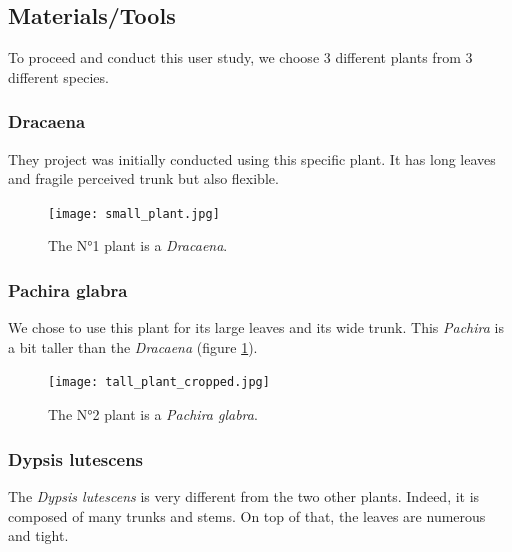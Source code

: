 \subsection{Materials/Tools}

To proceed and conduct this user study, we choose 3 different plants from 3 different species.

\newpage

\subsubsection{Dracaena}
They project was initially conducted using this specific plant. It has long leaves and fragile perceived trunk but also flexible.

\begin{figure}[h!]
    \centering
    \texttt{[image: small\_plant.jpg]}
    \caption{The N°1 plant is a \textit{Dracaena}.}
    
    \vspace{-0.5cm}
    \label{fig:small_plant}
    \vspace{0.2cm}
\end{figure}




\subsubsection{Pachira glabra}

We chose to use this plant for its large leaves and its wide trunk. This \textit{Pachira} is a bit taller than the \textit{Dracaena} (figure \ref{fig:small_plant}).
\begin{figure}[h!]
    \centering
    \texttt{[image: tall\_plant\_cropped.jpg]}
    \caption{The N°2 plant is a \textit{Pachira glabra}.}
    
    \vspace{-0.5cm}
    \label{fig:tall_plant}
    \vspace{0.2cm}
\end{figure}


\newpage

\subsubsection{Dypsis lutescens}

The \textit{Dypsis lutescens} is very different from the two other plants. Indeed, it is composed of many trunks and stems. On top of that, the leaves are numerous and tight.

